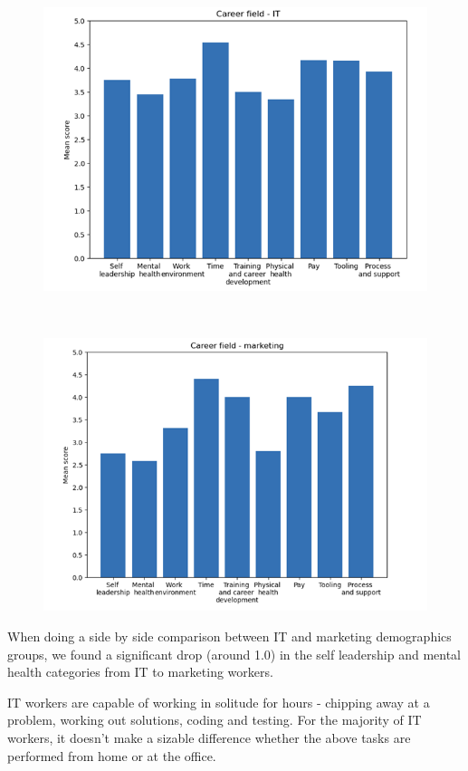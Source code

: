 \documentclass[12pt]{article}
\begin{document}
\begin{figure}[h]
    \centering
    \includegraphics[scale=1]{it.png}
    \label{it}
\end{figure} \\

\begin{figure}[h]
    \centering
    \includegraphics[scale=1]{marketing.png}
    \label{marketing}
\end{figure} 

When doing a side by side comparison between IT and marketing demographics groups, we found a significant drop (around 1.0)  in the self leadership and mental health categories from IT to marketing workers. 

IT workers are capable of working in solitude for hours - chipping away at a problem, working out solutions, coding and testing. For the majority of IT workers, it doesn’t make a sizable difference whether the above tasks are performed from home or at the office. 
\end{document}
